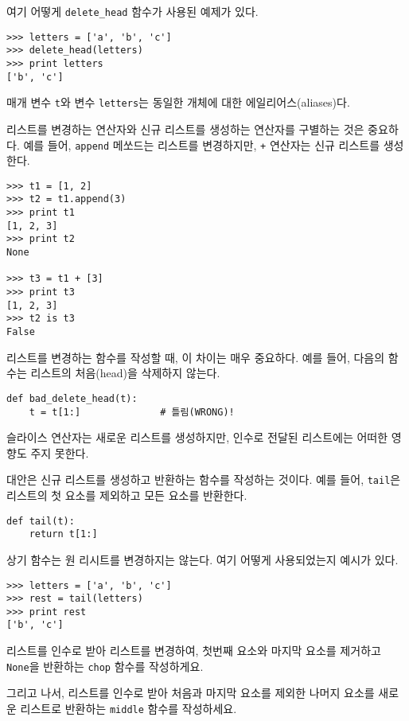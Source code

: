여기 어떻게 \verb"delete_head" 함수가 사용된 예제가 있다.

\beforeverb
\begin{verbatim}
>>> letters = ['a', 'b', 'c']
>>> delete_head(letters)
>>> print letters
['b', 'c']
\end{verbatim}
\afterverb
%

매개 변수 {\tt t}와 변수 {\tt letters}는 동일한 개체에 대한 에일리어스(aliases)다.

리스트를 변경하는 연산자와 신규 리스트를 생성하는 연산자를 구별하는 것은 중요하다.
예를 들어, {\tt append} 메쏘드는 리스트를 변경하지만, {\tt +} 연산자는 신규 리스트를 생성한다.


\beforeverb
\begin{verbatim}
>>> t1 = [1, 2]
>>> t2 = t1.append(3)
>>> print t1
[1, 2, 3]
>>> print t2
None

>>> t3 = t1 + [3]
>>> print t3
[1, 2, 3]
>>> t2 is t3
False
\end{verbatim}
\afterverb

리스트를 변경하는 함수를 작성할 때, 이 차이는 매우 중요하다.
예를 들어, 다음의 함수는 리스트의 처음(head)을 삭제하지 않는다.

\beforeverb
\begin{verbatim}
def bad_delete_head(t):
    t = t[1:]              # 틀림(WRONG)!
\end{verbatim}
\afterverb

슬라이스 연산자는 새로운 리스트를 생성하지만, 인수로 전달된 리스트에는 어떠한 영향도 주지 못한다.


대안은 신규 리스트를 생성하고 반환하는 함수를 작성하는 것이다. 예를 들어, {\tt tail}은 리스트의 첫 요소를 제외하고 모든 요소를 반환한다.

\beforeverb
\begin{verbatim}
def tail(t):
    return t[1:]
\end{verbatim}
\afterverb
%

상기 함수는 원 리시트를 변경하지는 않는다. 여기 어떻게 사용되었는지 예시가 있다.

\beforeverb
\begin{verbatim}
>>> letters = ['a', 'b', 'c']
>>> rest = tail(letters)
>>> print rest
['b', 'c']
\end{verbatim}
\afterverb


\begin{ex}

리스트를 인수로 받아 리스트를 변경하여, 첫번째 요소와 마지막 요소를 제거하고 {\tt None}을 반환하는 {\tt chop} 함수를 작성하게요.

그리고 나서, 리스트를 인수로 받아 처음과 마지막 요소를 제외한 나머지 요소를 새로운 리스트로 반환하는 {\tt middle} 함수를 작성하세요.

\end{ex}


